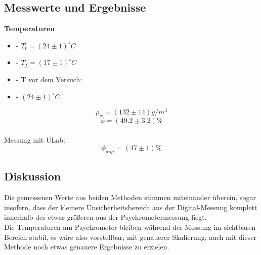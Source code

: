 \documentclass[12pt,a4paper]{article}
\begin{document}
\begin{multicols}{2}
\subsection{Messwerte und Ergebnisse}
\textbf{Temperaturen}\\
\begin {itemize}
	\item[-] $T_{t} = (24 \pm 1)^{\circ}C$
	\item[-] $T_{f} = (17 \pm 1)^{\circ}C$
	\item[-] T vor dem Versuch:
	\item[-] $(24 \pm 1)^{\circ}C$
\end{itemize}

$$\rho_w= (132 \pm 14)g/m^3$$
$$\phi =(49.2\pm 3.2)\%$$
\\
Messung mit ULab:
$$\phi_{digi}=(47 \pm 1)\%$$

\subsection{Diskussion}

Die gemessenen Werte aus beiden Methoden stimmen miteinander überein, sogar insofern, dass der kleinere Unsicherheitsbereich aus der Digital-Messung komplett innerhalb des etwas größeren aus der Psychrometermessung liegt.\\
Die Temperaturen am Psychrometer bleiben während der Messung im sichtbaren Bereich stabil, es wäre also vorstellbar, mit genauerer Skalierung, auch mit dieser Methode noch etwas genauere Ergebnisse zu erzielen.\\




\end{multicols}
\end{document}
